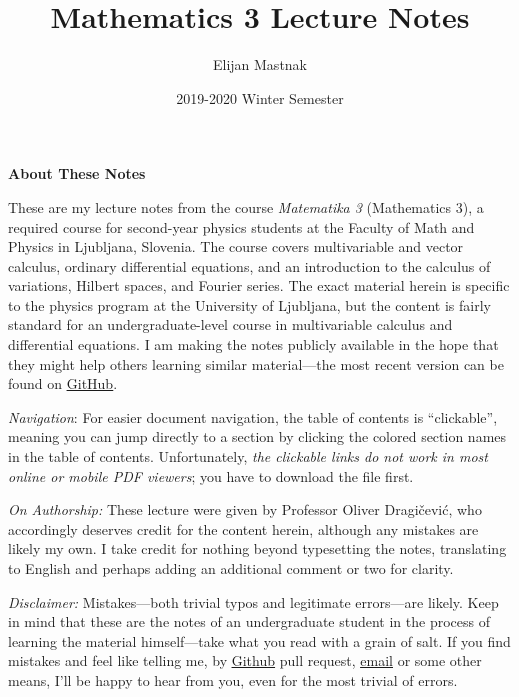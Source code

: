 \documentclass[11pt, a4paper]{article}
\begin{document}
\title{Mathematics 3 Lecture Notes}
\author{Elijan Mastnak}
\date{2019-2020 Winter Semester}
\maketitle


\begin{center}
\textbf{About These Notes}
\end{center}
These are my lecture notes from the course \textit{Matematika 3} (Mathematics 3), a required course for second-year physics students at the Faculty of Math and Physics in Ljubljana, Slovenia. The course covers  multivariable and vector calculus, ordinary differential equations, and an introduction to the calculus of variations, Hilbert spaces, and Fourier series. The exact material herein is specific to the physics program at the University of Ljubljana, but the content is fairly standard for an undergraduate-level course in multivariable calculus and differential equations. I am making the notes publicly available in the hope that they might help others learning similar material---the most recent version can be found on \href{https://github.com/ejmastnak/fmf/tree/main/math-3}{\underline{GitHub}}.

\vspace{2mm}
\textit{Navigation}: For easier document navigation, the table of contents is ``clickable'', meaning you can jump directly to a section by clicking the colored section names in the table of contents. Unfortunately, \textit{the clickable links do not work in most online or mobile PDF viewers}; you have to download the file first.


\vspace{2mm}
\textit{On Authorship:} These lecture were given by Professor Oliver Dragi\v{c}evi\'{c}, who accordingly deserves credit for the content herein, although any mistakes are likely my own. I take credit for nothing beyond typesetting the notes, translating to English and perhaps adding an additional comment or two for clarity.

\vspace{2mm}
\textit{Disclaimer:} Mistakes---both trivial typos and legitimate errors---are likely. Keep in mind that these are the notes of an undergraduate student in the process of learning the material himself---take what you read with a grain of salt. If you find mistakes and feel like telling me, by \href{https://github.com/ejmastnak/fmf}{\underline{Github}} pull request, \href{mailto:ejmastnak@gmail.com}{\underline{email}} or some other means, I'll be happy to hear from you, even for the most trivial of errors.
\end{document}
